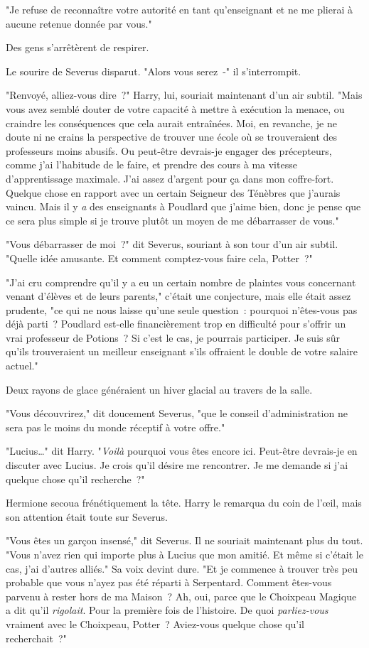 "Je refuse de reconnaître votre autorité en tant qu'enseignant et ne me plierai à aucune retenue donnée par vous."

Des gens s'arrêtèrent de respirer.

Le sourire de Severus disparut. "Alors vous serez~-" il s'interrompit.

"Renvoyé, alliez-vous dire~?" Harry, lui, souriait maintenant d'un air subtil. "Mais vous avez semblé douter de votre capacité à mettre à exécution la menace, ou craindre les conséquences que cela aurait entraînées. Moi, en revanche, je ne doute ni ne crains la perspective de trouver une école où se trouveraient des professeurs moins abusifs. Ou peut-être devrais-je engager des précepteurs, comme j'ai l'habitude de le faire, et prendre des cours à ma vitesse d'apprentissage maximale. J'ai assez d'argent pour ça dans mon coffre-fort. Quelque chose en rapport avec un certain Seigneur des Ténèbres que j'aurais vaincu. Mais il y \emph{a} des enseignants à Poudlard que j'aime bien, donc je pense que ce sera plus simple si je trouve plutôt un moyen de me débarrasser de vous."

"Vous débarrasser de moi~?" dit Severus, souriant à son tour d'un air subtil. "Quelle idée amusante. Et comment comptez-vous faire cela, Potter~?"

"J'ai cru comprendre qu'il y a eu un certain nombre de plaintes vous concernant venant d'élèves et de leurs parents," c'était une conjecture, mais elle était assez prudente, "ce qui ne nous laisse qu'une seule question~: pourquoi n'êtes-vous pas déjà parti~? Poudlard est-elle financièrement trop en difficulté pour s'offrir un vrai professeur de Potions~? Si c'est le cas, je pourrais participer. Je suis sûr qu'ils trouveraient un meilleur enseignant s'ils offraient le double de votre salaire actuel."

Deux rayons de glace généraient un hiver glacial au travers de la salle.

"Vous découvrirez," dit doucement Severus, "que le conseil d'administration ne sera pas le moins du monde réceptif à votre offre."

"Lucius…" dit Harry. "\emph{Voilà} pourquoi vous êtes encore ici. Peut-être devrais-je en discuter avec Lucius. Je crois qu'il désire me rencontrer. Je me demande si j'ai quelque chose qu'il recherche~?"

Hermione secoua frénétiquement la tête. Harry le remarqua du coin de l'œil, mais son attention était toute sur Severus.

"Vous êtes un garçon insensé," dit Severus. Il ne souriait maintenant plus du tout. "Vous n'avez rien qui importe plus à Lucius que mon amitié. Et même si c'était le cas, j'ai d'autres alliés." Sa voix devint dure. "Et je commence à trouver très peu probable que vous n'ayez pas été réparti à Serpentard. Comment êtes-vous parvenu à rester hors de ma Maison~? Ah, oui, parce que le Choixpeau Magique a dit qu'il \emph{rigolait}. Pour la première fois de l'histoire. De quoi \emph{parliez-vous} vraiment avec le Choixpeau, Potter~? Aviez-vous quelque chose qu'il recherchait~?"

